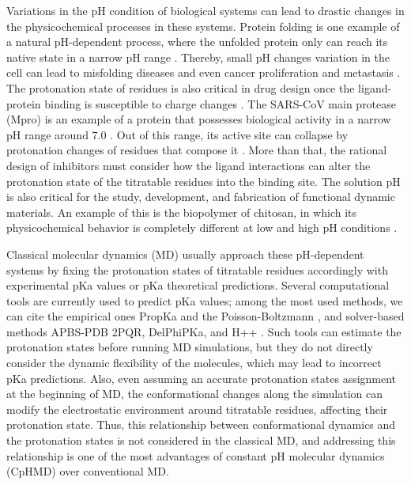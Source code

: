 \documentclass[9pt,tutorial]{livecoms}
\begin{document}
Variations in the pH condition of biological systems can lead to drastic changes in the physicochemical processes in these systems. 
Protein folding is one example of a natural pH-dependent process, where the unfolded protein only can reach its native state in a narrow pH range \cite{Pelegrine_Gasparetto_2005_LWT-FoodScienceandTechnology}. 
Thereby, small pH changes variation in the cell can lead to misfolding diseases and even cancer proliferation and metastasis \cite{vanderKamp_Daggett_2010_BiophysicalJournal,Webb_Barber_2011_NatRevCancer,Zheng_Liu_2020_TheInternationalJournalofBiochemistry&CellBiology}. 
The protonation state of residues is also critical in drug design once the ligand-protein binding is susceptible to charge changes \cite{Dominguez_Sussman_2010_Biochemistry,Bax_Edge_2017_ActaCrystallogrDStructBiol}. 
The SARS-CoV main protease (Mpro) is an example of a protein that possesses biological activity in a narrow pH range around 7.0 \cite{Tan_Hilgenfeld_2005_JournalofMolecularBiology}. Out of this range, its active site can collapse by protonation changes of residues that compose it \cite{Verma_Shen_2020_J.Am.Chem.Soc.}. More than that, the rational design of inhibitors must consider how the ligand interactions can alter the protonation state of the titratable residues into the binding site. The solution pH is also critical for the study, development, and fabrication of functional dynamic materials. An example of this is the biopolymer of chitosan, in which its physicochemical behavior is completely different at low and high pH conditions \cite{Morrow_Shen_2015_J.Am.Chem.Soc.}.

Classical molecular dynamics (MD) usually approach these pH-dependent systems by fixing the protonation states of titratable residues accordingly with experimental pKa values or pKa theoretical predictions. Several computational tools are currently used to predict pKa values; among the most used methods, we can cite the empirical ones PropKa and the Poisson-Boltzmann \cite{Olsson_Jensen_2011_J.Chem.TheoryComput.,Warwicker_Warwicker_2011_ProteinsStruct.Funct.Bioinforma.a}, and solver-based methods APBS-PDB 2PQR, DelPhiPKa, and H++ \cite{Unni_Baker_2011_J.Comput.Chem.,Wang_Alexov_2016_Bioinformatics,Anandakrishnan_Onufriev_2012_NucleicAcidsResearch}. Such tools can estimate the protonation states before running MD simulations, but they do not directly consider the dynamic flexibility of the molecules, which may lead to incorrect pKa predictions. Also, even assuming an accurate protonation states assignment at the beginning of MD, the conformational changes along the simulation can modify the electrostatic environment around titratable residues, affecting their protonation state. Thus, this relationship between conformational dynamics and the protonation states is not considered in the classical MD, and addressing this relationship is one of the most advantages of constant pH molecular dynamics (CpHMD) over conventional MD. 
\end{document}
